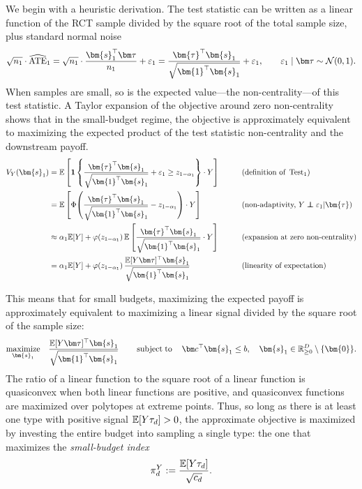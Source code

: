 We begin with a heuristic derivation.
The test statistic can be written as a linear function of the RCT sample divided by the square root of the total sample size, plus standard normal noise
\[
  \sqrt{n_1}\cdot\widehat{\ATE}_1
  =
  \sqrt{n_1}\cdot\frac{\bm{s}_1^\top\bm\tau}{n_1}+\varepsilon_1
  =
  \frac{\bm{\tau}^\top\bm{s}_1}{\sqrt{\bm{1}^\top\bm{s}_1}}+\varepsilon_1,
  \qquad
  \varepsilon_1\mid \bm\tau\sim\mathcal{N}(0,1).
\]
When samples are small, so is the expected value---the non-centrality---of this test statistic.
A Taylor expansion of the objective around zero non-centrality shows that in the small-budget regime, the objective is approximately equivalent to maximizing the expected product of the test statistic non-centrality and the downstream payoff.
\begin{alignat*}{2}
  V_Y(\bm{s}_1)
  &=
  \E\left[\indic{\frac{\bm{\tau}^\top\bm{s}_1}{\sqrt{\bm{1}^\top\bm{s}_1}}+\varepsilon_1 \ge z_{1-\alpha_1}} \cdot Y\right]
  &\qquad&
  (\text{definition of }\Test_1) \\
  &=
  \E\left[
    \Phi\!\left(
      \frac{\bm{\tau}^\top\bm{s}_1}{\sqrt{\bm{1}^\top\bm{s}_1}}
      - z_{1-\alpha_1}
    \right)
    \cdot Y
  \right]
  &\qquad&
  (\text{non-adaptivity, }Y\ind \varepsilon_1 \vert \bm{\tau}) \\
  &\approx
  \alpha_1\E[Y]
  +\varphi(z_{1-\alpha_1})\,
  \E\left[
    \frac{\bm{\tau}^\top\bm{s}_1}{\sqrt{\bm{1}^\top\bm{s}_1}}
    \cdot Y
  \right]
  &\qquad&
  (\text{expansion at zero non-centrality}) \\
  &=
  \alpha_1\E[Y]
  +\varphi(z_{1-\alpha_1})\,
  \frac{\E[Y \bm\tau]^\top\bm{s}_1}{\sqrt{\bm{1}^\top\bm{s}_1}}
  &\qquad&
  (\text{linearity of expectation})
\end{alignat*}

This means that for small budgets, maximizing the expected payoff is approximately equivalent to maximizing a linear signal divided by the square root of the sample size:
\begin{align*}
  \underset{\bm{s}_1}{\maximize}
  \quad
  \frac{\E[Y \bm\tau]^\top\bm{s}_1}{\sqrt{\bm{1}^\top\bm{s}_1}}
  \qquad
  \subjectto
  \quad
  \bm c^\top\bm{s}_1\le b,
  \quad
  \bm{s}_1\in\R_{\geq 0}^{D}\setminus\{\bm{0}\}.
\end{align*}
The ratio of a linear function to the square root of a linear function is quasiconvex when both linear functions are positive, and quasiconvex functions are maximized over polytopes at extreme points.
Thus, so long as there is at least one type with positive signal $\mathbb{E}[Y \tau_d]>0$, the approximate objective is maximized by investing the entire budget into sampling a single type: the one that maximizes the \emph{small-budget index}
\[
  \pi_d^Y
  :=
  \frac{\mathbb{E}[Y \tau_d]}{\sqrt{c_{d}}}.
\]

